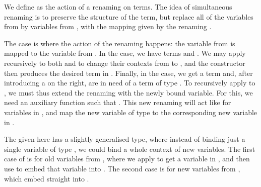 \Ren{}
\Sub{}

We define  as the action of a renaming on terms.
The idea of simultaneous renaming is to preserve the structure of the term, but
replace all of the variables from \AgdaBound{$\Delta$} by variables from
\AgdaBound{$\Gamma$}, with the mapping given by the renaming \AgdaBound{$\rho$}.

\rename{}

The  case is where the action of the renaming
happens: the variable  from \AgdaBound{$\Delta$} is mapped to the
variable \AgdaBound{$\rho$}\AgdaSpace{} from \AgdaBound{$\Gamma$}.
In the  case, we have terms 
\AgdaSymbol{:} \AgdaBound{$\Delta$} \AgdaDatatype{$\vdash$}
   and 
\AgdaSymbol{:} \AgdaBound{$\Delta$} \AgdaDatatype{$\vdash$} .
We may apply  \AgdaBound{$\rho$} recursively to both
 and  to change their contexts from
\AgdaBound{$\Delta$} to \AgdaBound{$\Gamma$}, and the
 constructor then produces the desired term in
\AgdaBound{$\Gamma$}.
Finally, in the  case, we get a term
 \AgdaSymbol{:} \DA{} \AgdaDatatype{$\vdash$}  and,
after introducing a  on the right, are in need
of a term of type \GA{} \AgdaDatatype{$\vdash$} .
To recursively apply  to , we must thus extend
the renaming \AgdaBound{$\rho$} \AgdaSymbol{:} \RenGD{} with the newly bound
variable.
For this, we need an auxiliary function  such that
 \AgdaBound{$\rho$} \AgdaSymbol{:} \RenGADA{}.
This new renaming will act like \AgdaBound{$\rho$} for variables in
\AgdaBound{$\Delta$}, and map the new variable of type  to the
corresponding new variable in \GA{}.

\bindRen{}

The  given here has a slightly generalised type, where
instead of binding just a single variable of type , we could
bind a whole context \AgdaBound{$\Theta$} of new variables.
The first case of  is for old variables from
\AgdaBound{$\Delta$}, where we apply \AgdaBound{$\rho$} to get a variable in
\AgdaBound{$\Gamma$}, and then use  to embed that variable
into \GTh{}.
The second case is for new variables from \AgdaBound{$\Theta$}, which embed
straight into \GTh{}.

